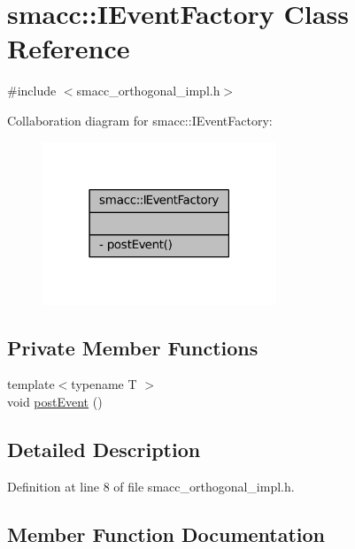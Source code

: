 \hypertarget{classsmacc_1_1IEventFactory}{}\section{smacc\+:\+:I\+Event\+Factory Class Reference}
\label{classsmacc_1_1IEventFactory}


{\ttfamily \#include $<$smacc\+\_\+orthogonal\+\_\+impl.\+h$>$}



Collaboration diagram for smacc\+:\+:I\+Event\+Factory\+:
\nopagebreak
\begin{figure}[H]
\begin{center}
\leavevmode
\includegraphics[width=198pt]{classsmacc_1_1IEventFactory__coll__graph}
\end{center}
\end{figure}
\subsection*{Private Member Functions}
\begin{DoxyCompactItemize}
\item 
{\footnotesize template$<$typename T $>$ }\\void \hyperlink{classsmacc_1_1IEventFactory_ae112bd549c8a99d872417b54f401cf3f}{post\+Event} ()
\end{DoxyCompactItemize}


\subsection{Detailed Description}


Definition at line 8 of file smacc\+\_\+orthogonal\+\_\+impl.\+h.



\subsection{Member Function Documentation}
